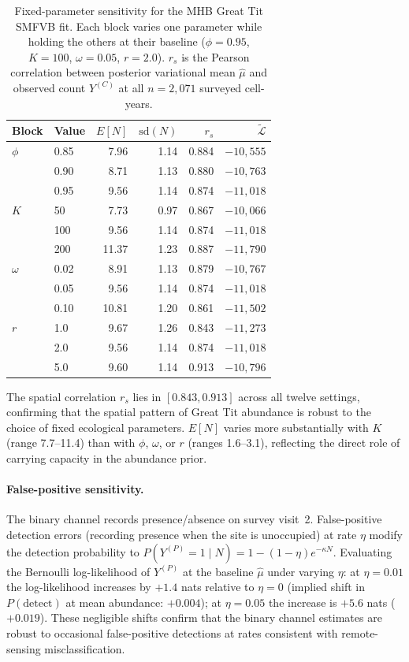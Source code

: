 \documentclass[review,12pt]{elsarticle}
\theoremstyle{definition}
\begin{document}
\begin{table}[ht]
\centering
\caption{Fixed-parameter sensitivity for the MHB Great Tit SMFVB fit.
Each block varies one parameter while holding the others at their baseline
($\phi=0.95$, $K=100$, $\omega=0.05$, $r=2.0$).
$r_s$ is the Pearson correlation between posterior variational mean $\hat\mu$
and observed count $Y^{(C)}$ at all $n=2{,}071$ surveyed cell-years.}
\label{tab:sensitivity}
\begin{tabular}{llrrrr}
\toprule
Block & Value & $E[N]$ & $\mathrm{sd}(N)$ & $r_s$ & $\tilde{\mathcal{L}}$ \\
\midrule
$\phi$ & 0.85 & 7.96 & 1.14 & 0.884 & $-10{,}555$ \\
       & 0.90 & 8.71 & 1.13 & 0.880 & $-10{,}763$ \\
       & 0.95 & 9.56 & 1.14 & 0.874 & $-11{,}018$ \\
\midrule
$K$    & 50   & 7.73 & 0.97 & 0.867 & $-10{,}066$ \\
       & 100  & 9.56 & 1.14 & 0.874 & $-11{,}018$ \\
       & 200  & 11.37& 1.23 & 0.887 & $-11{,}790$ \\
\midrule
$\omega$ & 0.02 & 8.91 & 1.13 & 0.879 & $-10{,}767$ \\
         & 0.05 & 9.56 & 1.14 & 0.874 & $-11{,}018$ \\
         & 0.10 & 10.81& 1.20 & 0.861 & $-11{,}502$ \\
\midrule
$r$    & 1.0  & 9.67 & 1.26 & 0.843 & $-11{,}273$ \\
       & 2.0  & 9.56 & 1.14 & 0.874 & $-11{,}018$ \\
       & 5.0  & 9.60 & 1.14 & 0.913 & $-10{,}796$ \\
\bottomrule
\end{tabular}
\end{table}

\noindent
The spatial correlation $r_s$ lies in $[0.843, 0.913]$ across all twelve
settings, confirming that the spatial pattern of Great Tit abundance is
robust to the choice of fixed ecological parameters.  $E[N]$ varies more
substantially with $K$ (range 7.7--11.4) than with $\phi$, $\omega$, or
$r$ (ranges 1.6--3.1), reflecting the direct role of carrying capacity
in the abundance prior.

\paragraph{False-positive sensitivity.}
The binary channel records presence/absence on survey visit~2.
False-positive detection errors (recording presence when the site is
unoccupied) at rate $\eta$ modify the detection probability to
$P(Y^{(P)}=1\mid N)=1-(1-\eta)e^{-\kappa N}$.  Evaluating the Bernoulli
log-likelihood of $Y^{(P)}$ at the baseline $\hat\mu$ under varying $\eta$:
at $\eta=0.01$ the log-likelihood increases by $+1.4$ nats relative to
$\eta=0$ (implied shift in $P(\text{detect})$ at mean abundance: $+0.004$);
at $\eta=0.05$ the increase is $+5.6$ nats ($+0.019$).  These negligible
shifts confirm that the binary channel estimates are robust to occasional
false-positive detections at rates consistent with remote-sensing
misclassification.
\end{document}
